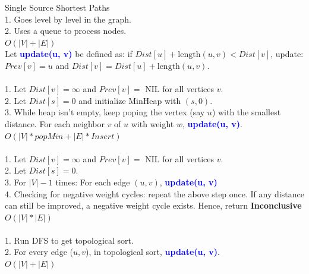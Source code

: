 \documentclass[10pt,a4paper]{article}
\begin{document}
\begin{multicols}{3}
    \begin{textbox}{Single Source Shortest Paths}
          \\
        1. Goes level by level in the graph.\\
        2. Uses a queue to process nodes.\\
         $O(|V| + |E|)$ \\
        \linebreak
        Let  {\bf \textcolor{blue}{update(u, v)}} be defined as: if $Dist[u] + \text{length}(u, v)< Dist[v]$, update: $Prev[v] = u$ and $Dist[v] = Dist[u] + \text{length}(u, v)$.\\
          \\
        1. Let $Dist[v] = \infty$ and $Prev[v] = $ NIL for all vertices $v$.\\
        2. Let $Dist[s] = 0$ and initialize MinHeap with $(s, 0)$.\\
        3. While heap isn't empty, keep poping the vertex (say $u$) with the smallest distance. For each neighbor $v$ of $u$ with weight $w$, {\bf \textcolor{blue}{update(u, v)}}.\\
        \linebreak
         $O(|V|*popMin + |E|*Insert)$ \\
        \linebreak
         \\
        1. Let $Dist[v] = \infty$ and $Prev[v] = $ NIL for all vertices $v$.\\
        2. Let $Dist[s] = 0$.\\
        3. For $|V|-1$ times: For each edge $(u, v)$, {\bf \textcolor{blue}{update(u, v)}}\\
        4. Checking for negative weight cycles: repeat the above step once. If any distance can still be improved, a negative weight cycle exists. Hence, return {\bf Inconclusive}\\
        \linebreak
         $O(|V|*|E|)$ \\
        \linebreak
          \\
        1. Run DFS to get topological sort.\\
        2. For every edge ($u, v$), in topological sort, {\bf \textcolor{blue}{update(u, v)}}.\\
         $O(|V| + |E|)$ \\
    \end{textbox}


\end{multicols}
\end{document}
